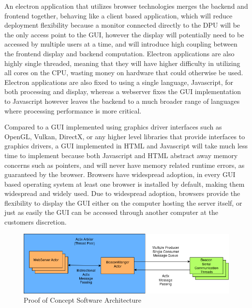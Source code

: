 \bigskip
An electron application that utilizes browser technologies merges the backend and frontend together, behaving like a client based application, which will reduce deployment flexibility because a monitor connected directly to the DPU will be the only access point to the GUI, however the display will potentially need to be accessed by multiple users at a time, and will introduce high coupling between the frontend display and backend computation.
Electron applications are also highly single threaded, meaning that they will have higher difficulty in utilizing all cores on the CPU, wasting money on hardware that could otherwise be used.
Electron applications are also fixed to using a single language, Javascript, for both processing and display, whereas a webserver fixes the GUI implementation to Javascript however leaves the backend to a much broader range of languages where processing performance is more critical.

\pagebreak
Compared to a GUI implemented using graphics driver interfaces such as OpenGL, Vulkan, DirectX, or any higher level libraries that provide interfaces to graphics drivers, a GUI implemented in HTML and Javascript will take much less time to implement because both Javascript and HTML abstract away memory concerns such as pointers, and will never have memory related runtime errors, as guaranteed by the browser.
Browsers have widespread adoption, in every GUI based operating system at least one browser is installed by default, making them widespread and widely used.
Due to widespread adoption, browsers provide the flexibility to display the GUI either on the computer hosting the server itself, or just as easily the GUI can be accessed through another computer at the customers discretion.

\bigskip
\begin{figure}[H]
	\centering
    \includegraphics[scale=0.6]{images/poc_arch.png}
    \caption{Proof of Concept Software Architecture}
    \label{software_poc_arch}
\end{figure}

